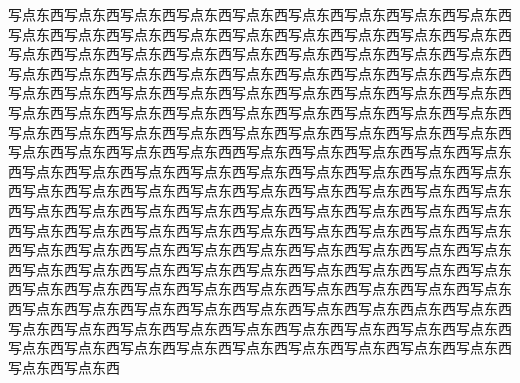 写点东西写点东西写点东西写点东西写点东西写点东西写点东西写点东西写点东西写点东西写点东西写点东西写点东西写点东西写点东西写点东西写点东西写点东西写点东西写点东西写点东西写点东西写点东西写点东西写点东西写点东西写点东西写点东西写点东西写点东西写点东西写点东西写点东西写点东西写点东西写点东西写点东西写点东西写点东西写点东西写点东西写点东西写点东西写点东西写点东西写点东西写点东西写点东西写点东西写点东西写点东西写点东西写点东西写点东西写点东西写点东西写点东西写点东西写点东西写点东西写点东西写点东西写点东西写点东西写点东西写点东西写点东西西写点东西写点东西写点东西写点东西写点东西写点东西写点东西写点东西写点东西写点东西写点东西写点东西写点东西写点东西写点东西写点东西写点东西写点东西写点东西写点东西写点东西写点东西写点东西写点东西写点东西写点东西写点东西写点东西写点东西写点东西写点东西写点东西写点东西写点东西写点东西写点东西写点东西写点东西写点东西写点东西写点东西写点东西写点东西写点东西写点东西写点东西写点东西写点东西写点东西写点东西写点东西写点东西写点东西写点东西写点东西写点东西写点东西写点东西写点东西写点东西写点东西写点东西写点东西写点东西写点东西写点东西写点东西写点东西写点东西写点东西写点东西写点东西写点东西写点东西写点东西点东西写点东西写点东西写点东西写点东西写点东西写点东西写点东西写点东西写点东西写点东西写点东西写点东西写点东西写点东西写点东西写点东西写点东西写点东西写点东西写点东西写点东西





